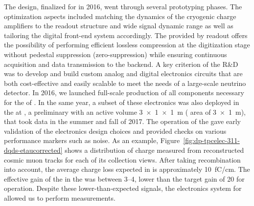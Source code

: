 The design, finalized for  in 2016, went through several prototyping phases. The optimization aspects included matching the dynamics of the cryogenic charge amplifiers to the  readout structure and wide signal dynamic range as well as tailoring the digital front-end system accordingly. The  provided by  readout offers the possibility of performing efficient lossless compression at the digitization stage without pedestal suppression (zero-suppression) while ensuring continuous acquisition and data transmission to the  backend. A key criterion of the R\&D was to develop and build custom analog and digital electronics circuits that are both cost-effective and easily scalable to meet the needs of a large-scale neutrino  detector. In 2016, we launched full-scale production of all components necessary for the  of . In the same year, a subset of these electronics was also deployed in the  at , a preliminary   with an active volume \SI[product-units=power]{3x1x1}{m} ( area of \SI[product-units=power]{3x1}{m}), that took data in the summer and fall of 2017. The operation of the  \cite{Aimard:2018yxp} gave early validation of the electronics  design choices and provided checks on various performance markers such as noise. As an example, Figure~\ref{fig:dp-tpcelec-311-dqds-etaucorrected} shows a distribution of charge measured from reconstructed cosmic muon tracks for each of its collection views. After taking recombination into account, the average  charge loss expected in  is approximately \SI{10}{\femto\coulomb/\cm}. The effective gain of the  in the  was between \numrange{3}{4}, lower than the target gain of \num{20} for  operation. Despite these lower-than-expected signals, the electronics system for  allowed us to perform measurements. 

